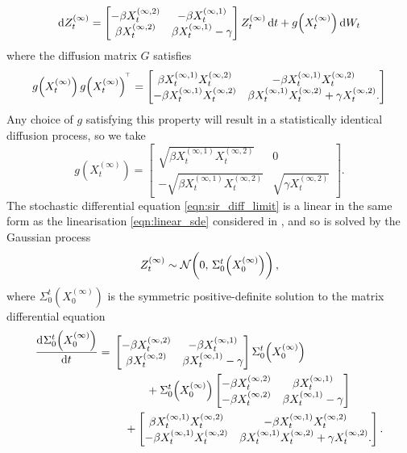 \begin{equation}
	\dif Z_t^{(\infty)} = \begin{bmatrix}
		-\beta X_t^{(\infty, 2)} & -\beta X_t^{(\infty, 1)}         \\
		\beta X_t^{(\infty, 2)}  & \beta X_t^{(\infty, 1)} - \gamma
	\end{bmatrix} Z_t^{(\infty)}\dif t + g\!\left(X_t^{(\infty)}\right)\dif W_t
	\label{eqn:sir_diff_limit}
\end{equation}
where the diffusion matrix \(G\) satisfies
\[
	g\!\left(X_t^{(\infty)}\right)g\!\left(X_t^{(\infty)}\right)^{^{\!\top}} = \begin{bmatrix}
		\beta X_t^{(\infty, 1)} X_t^{(\infty, 2)}  & -\beta X_t^{(\infty, 1)} X_t^{(\infty, 2)}                              \\
		-\beta X_t^{(\infty, 1)} X_t^{(\infty, 2)} & \beta X_t^{(\infty, 1)} X_t^{(\infty, 2)} + \gamma X_{t}^{(\infty, 2)}.
	\end{bmatrix}
\]
Any choice of \(g\) satisfying this property will result in a statistically identical diffusion process, so we take
\[
	g\!\left(X_t^{(\infty)}\right) = \begin{bmatrix}
		\sqrt{\beta X_t^{(\infty, 1)} X_t^{(\infty, 2)}}  & 0                               \\
		-\sqrt{\beta X_t^{(\infty, 1)} X_t^{(\infty, 2)}} & \sqrt{\gamma X_t^{(\infty, 2)}}
	\end{bmatrix}.
\]
The stochastic differential equation \cref{eqn:sir_diff_limit} is a linear in the same form as the linearisation \cref{eqn:linear_sde} considered in , and so is solved by the Gaussian process
\[
	Z_t^{(\infty)} \sim\mathcal{N}\!\left(0,\, \Sigma_0^t\!\left(X_0^{(\infty)}\right)\right),
\]
where \(\Sigma_0^t\!\left(X_0^{(\infty)}\right)\) is the symmetric positive-definite solution to the matrix differential equation
\[
	\dod{\Sigma_0^t\!\left(X_0^{(\infty)}\right)}{t} = \begin{multlined}[t]
		\begin{bmatrix}
			-\beta X_t^{(\infty, 2)} & -\beta X_t^{(\infty, 1)}         \\
			\beta X_t^{(\infty, 2)}  & \beta X_t^{(\infty, 1)} - \gamma
		\end{bmatrix}\Sigma_0^t\!\left(X_0^{(\infty)}\right) \\
		+ \Sigma_0^t\!\left(X_0^{(\infty)}\right)\begin{bmatrix}
			-\beta X_t^{(\infty, 2)} & \beta X_t^{(\infty, 1)}          \\
			-\beta X_t^{(\infty, 2)} & \beta X_t^{(\infty, 1)} - \gamma
		\end{bmatrix} \\
		+ \begin{bmatrix}
			\beta X_t^{(\infty, 1)} X_t^{(\infty, 2)}  & -\beta X_t^{(\infty, 1)} X_t^{(\infty, 2)}                              \\
			-\beta X_t^{(\infty, 1)} X_t^{(\infty, 2)} & \beta X_t^{(\infty, 1)} X_t^{(\infty, 2)} + \gamma X_{t}^{(\infty, 2)}.
		\end{bmatrix}.
	\end{multlined}
\]

